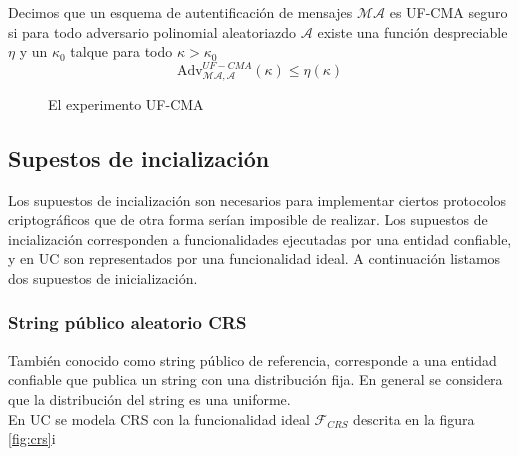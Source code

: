 \begin{definicion}
Decimos que un esquema de autentificación de mensajes $\mathcal{MA}$ es UF-CMA seguro si para todo
adversario polinomial aleatoriazdo $\mathcal{A}$ existe una función despreciable $\eta$ y un $\kappa_0$
talque para todo $\kappa > \kappa_0$
$$\mathrm{Adv}^{UF-CMA}_{\mathcal{MA}, \mathcal{A}}(\kappa) \leq \eta(\kappa)$$
\end{definicion}

\begin{figure}
\caption{El experimento UF-CMA}
\label{fig:uf-cma}
\end{figure}

\subsection{Supestos de incialización}
Los supuestos de incialización son necesarios para implementar ciertos protocolos criptográficos
que de otra forma serían imposible de realizar. Los supuestos de incialización corresponden a funcionalidades
ejecutadas por una entidad confiable, y en UC son representados por una funcionalidad ideal. A continuación
listamos dos supuestos de inicialización.


\subsubsection{String público aleatorio CRS}
También conocido como string público de referencia, corresponde a una entidad confiable que publica un string
con una distribución fija. En general se considera que la distribución del string es una uniforme.\\
En UC se modela CRS con la funcionalidad ideal $\mathcal{F}_{CRS}$ descrita en la figura \ref{fig:crs}i

